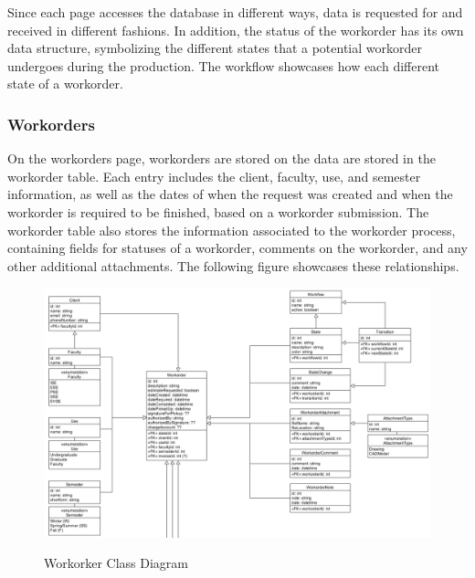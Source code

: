 {{{{{{{Since each page accesses the database in different ways, data is requested for and received in different fashions. In addition, the status of the workorder has its own data structure, symbolizing the different states that a potential workorder undergoes during the production. The workflow showcases how each different state of a workorder.
\newpage 
\subsubsection{Workorders}
On the workorders page, workorders are stored on the data are stored in the workorder table. Each entry includes the client, faculty, use, and semester information, as well as the dates of when the request was created and when the workorder is required to be finished, based on a workorder submission. The workorder table also stores the information associated to the workorder process, containing fields for statuses of a workorder, comments on the workorder, and any other additional attachments. The following figure showcases these relationships. 
\begin{figure}[H]
	\centering
	\includegraphics[width=5in]{workorder.png}\\
	\caption{Workorker Class Diagram}
	\label{fig:tobias}
\end{figure}
}}}}}}}
